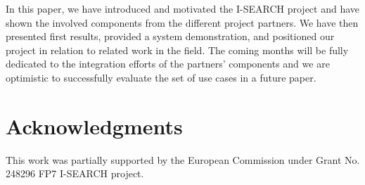 \documentclass{www2012-comp-accepted}
\newcommand{\inlinelistingsize}{\fontsize{8pt}{11pt}}
\let\oldttdefault\ttdefault
\renewcommand{\ttdefault}{pcr}
\let\oldurl\url
\renewcommand{\url}[1]{\inlinelistingsize\oldurl{#1}}
\begin{document}
In this paper, we have introduced and motivated the \mbox{I-SEARCH} project and have shown the involved components from the different project partners.
We have then presented first results, provided a system demonstration, and positioned our project in relation to related work in the field.
The coming months will be fully dedicated to the integration efforts of the partners' components and we are optimistic to successfully evaluate the set of use cases in a future paper.

\section{Acknowledgments}
This work was partially supported by the European Commission under Grant No. 248296 FP7 \mbox{I-SEARCH} project.

\let\ttdefault\oldttdefault
\let\url\oldurl




\balancecolumns
\end{document}

